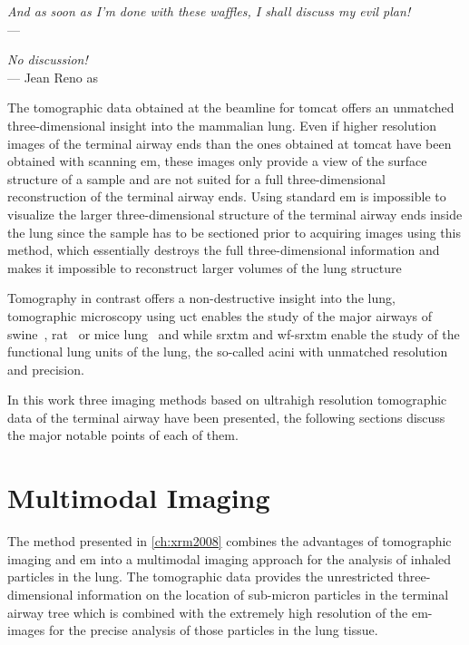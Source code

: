 \acresetall
{}\label{ch:discussion}
\begin{flushright}{\slshape And as soon as I'm done with these waffles, I shall discuss my evil plan!} \\ \medskip
	---  \citep{Zim}
\end{flushright}
\begin{flushright}{\slshape No discussion!} \\ \medskip
	--- Jean Reno as \citep{Leon}
\end{flushright}
\vspace{52mm}
The tomographic data obtained at the beamline for \ac{tomcat} offers an unmatched three-dimensional insight into the mammalian lung. Even if higher resolution images of the terminal airway ends than the ones obtained at \ac{tomcat} have been obtained with scanning \ac{em}, these images only provide a view of the surface structure of a sample and are not suited for a full three-dimensional reconstruction of the terminal airway ends. Using standard \ac{em} is impossible to visualize the larger three-dimensional structure of the terminal airway ends inside the lung since the sample has to be sectioned prior to acquiring images using this method, which essentially destroys the full three-dimensional information and makes it impossible to reconstruct larger volumes of the lung structure

Tomography in contrast offers a non-destructive insight into the lung, tomographic microscopy using \ac{uct} enables the study of the major airways of swine~\cite{Litzlbauer2006}, rat~\cite{Langheinrich2004a,Sharif2010} or mice lung~\cite{Langheinrich2004,Ritman2005} and while \ac{srxtm} and \ac{wf-srxtm} enable the study of the functional lung units of the lung, the so-called acini with unmatched resolution and precision.

In this work three imaging methods based on ultrahigh resolution tomographic data of the terminal airway have been presented, the following sections discuss the major notable points of each of them.

\section{Multimodal Imaging}
The method presented in \autoref{ch:xrm2008} combines the advantages of tomographic imaging and \ac{em} into a multimodal imaging approach for the analysis of inhaled particles in the lung. The tomographic data provides the unrestricted three-dimensional information on the location of sub-micron particles in the terminal airway tree which is combined with the extremely high resolution of the \ac{em}-images for the precise analysis of those particles in the lung tissue.

